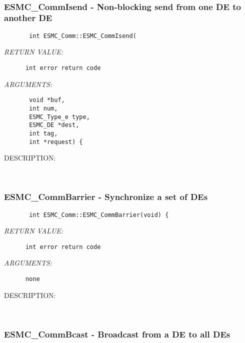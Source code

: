 \mbox{}\hrulefill\ 
 
\subsubsection{ESMC\_CommIsend - Non-blocking send from one DE to another DE}


  
\begin{verbatim}       int ESMC_Comm::ESMC_CommIsend(\end{verbatim}{\em RETURN VALUE:}
\begin{verbatim}      int error return code\end{verbatim}{\em ARGUMENTS:}
\begin{verbatim}       void *buf,
       int num,
       ESMC_Type_e type,
       ESMC_DE *dest,
       int tag,
       int *request) {\end{verbatim}
{\sf DESCRIPTION:\\ }


        
   
 
\mbox{}\hrulefill\ 
 
\subsubsection{ESMC\_CommBarrier - Synchronize a set of DEs}


  
\begin{verbatim}       int ESMC_Comm::ESMC_CommBarrier(void) {\end{verbatim}{\em RETURN VALUE:}
\begin{verbatim}      int error return code\end{verbatim}{\em ARGUMENTS:}
\begin{verbatim}      none\end{verbatim}
{\sf DESCRIPTION:\\ }


        
   
 
\mbox{}\hrulefill\ 
 
\subsubsection{ESMC\_CommBcast - Broadcast from a DE to all DEs}


